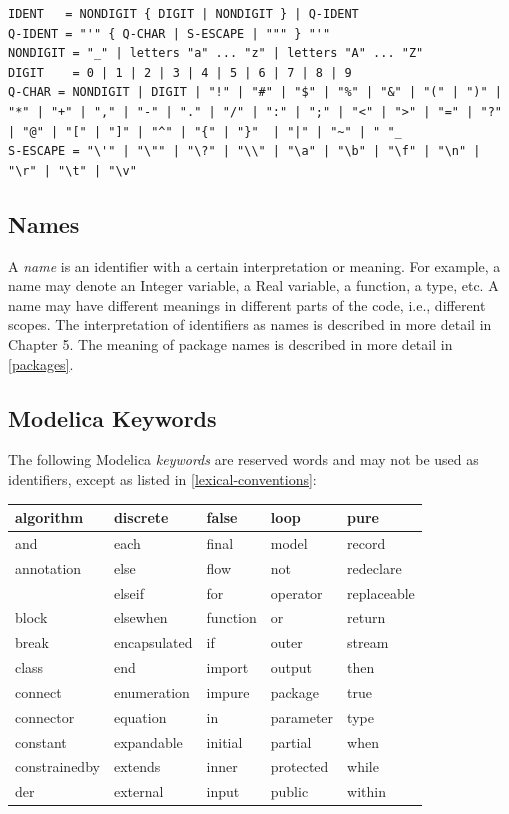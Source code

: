 \documentclass[10pt,a4paper]{report}
\def\doublelabel#1{\label{#1}\hypertarget{#1}{}}
\begin{document}
\begin{lstlisting}[language=grammar]
IDENT   = NONDIGIT { DIGIT | NONDIGIT } | Q-IDENT
Q-IDENT = "'" { Q-CHAR | S-ESCAPE | """ } "'"
NONDIGIT = "_" | letters "a" ... "z" | letters "A" ... "Z"
DIGIT    = 0 | 1 | 2 | 3 | 4 | 5 | 6 | 7 | 8 | 9
Q-CHAR = NONDIGIT | DIGIT | "!" | "#" | "$" | "%" | "&" | "(" | ")" | "*" | "+" | "," | "-" | "." | "/" | ":" | ";" | "<" | ">" | "=" | "?" | "@" | "[" | "]" | "^" | "{" | "}"  | "|" | "~" | " "_
S-ESCAPE = "\'" | "\"" | "\?" | "\\" | "\a" | "\b" | "\f" | "\n" | "\r" | "\t" | "\v"
\end{lstlisting}

\subsection{Names}\doublelabel{names}

A \emph{name} is an identifier with a certain interpretation or meaning.
For example, a name may denote an Integer variable, a Real variable, a
function, a type, etc. A name may have different meanings in different
parts of the code, i.e., different scopes. The interpretation of
identifiers as names is described in more detail in Chapter 5. The
meaning of package names is described in more detail in \ref{packages}.

\subsection{Modelica Keywords}\doublelabel{modelica-keywords}

The following Modelica \emph{keywords} are reserved words and may not be
used as identifiers, except as listed in \ref{lexical-conventions}:

\begin{longtable}[c]{@{}lllll@{}}
algorithm & discrete & false & loop & pure\\ \hline
and & each & final & model & record\\ \hline
annotation & else & flow & not & redeclare\\ \hline
& elseif & for & operator & replaceable\\ \hline
block & elsewhen & function & or & return\\ \hline
break & encapsulated & if & outer & stream\\ \hline
class & end & import & output & then\\ \hline
connect & enumeration & impure & package & true\\ \hline
connector & equation & in & parameter & type\\ \hline
constant & expandable & initial & partial & when\\ \hline
constrainedby & extends & inner & protected & while\\ \hline
der & external & input & public & within\\ \hline
\end{longtable}
\end{document}

